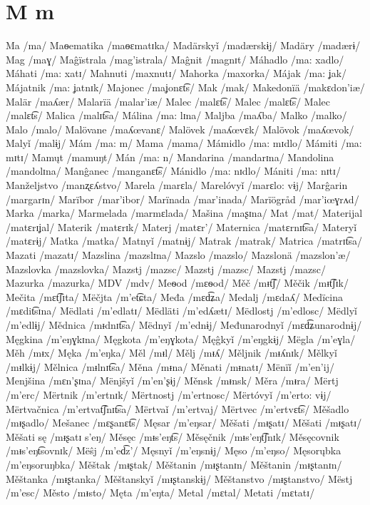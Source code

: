 \chapter{M m}

Ma /ma/
Maѳematika /maѳɛmatɪka/
Madärskyǐ /madærskɨj/
Madäry /madærɨ/
Mag /maɣ/
Maĝïstrala /mag’istrala/
Maĝnit /magnɪt/
Máhadlo /ma: xadlo/
Máhati /ma: xatɪ/
Mahnuti /maxnutɪ/
Mahorka /maxorka/
Májak /ma: ʝak/
Májatnik /ma: ʝatnɪk/
Majonec /maʝonɛt͡s/
Mak /mak/
Makedonïä /makɛdon’iæ/
Malär /maʎær/
Malarïä /malar’iæ/
Malec /malɛt͡s/
Malec /malɛt͡s/
Malec /malɛt͡s/
Malica /malɪt͡sa/
Málina /ma: lɪna/
Maljba /maʎba/
Malko /malko/
Malo /malo/
Malövane /maʎœvanɛ/
Malövek /maʎœvɛk/
Malövok /maʎœvok/
Malyǐ /malɨj/
Mám /ma: m/
Mama /mama/
Mámidlo /ma: mɪdlo/
Mámiti /ma: mɪtɪ/
Mamųt /mamuŋt/
Mán /ma: n/
Mandarina /mandarɪna/
Mandolina /mandolɪna/
Manĝanec /manganɛt͡s/
Mánidlo /ma: nɪdlo/
Mániti /ma: nɪtɪ/
Manželjstvo /manʐɛʎstvo/
Marela /marɛla/
Marelóvyǐ /marɛlo: vɨj/
Marĝarin /margarɪn/
Marïbor /mar’ibor/
Marïnada /mar’inada/
Marïögråd /mar’iœɣrʌd/
Marka /marka/
Marmelada /marmɛlada/
Mašina /maʂɪna/
Mat /mat/
Materijal /matɛrɪʝal/
Materik /matɛrɪk/
Materj /matɛr’/
Maternica /matɛrnɪt͡sa/
Materyǐ /matɛrɨj/
Matka /matka/
Matnyǐ /matnɨj/
Matrak /matrak/
Matrica /matrɪt͡sa/
Mazati /mazatɪ/
Mazslina /mazslɪna/
Mazslo /mazslo/
Mazslonä /mazslon’æ/
Mazslovka /mazslovka/
Mazstj /mazsc/
Mazstj /mazsc/
Mazstj /mazsc/
Mazurka /mazurka/
MDV /mdv/
Meѳod /mɛѳod/
Měč /mᵻt͡ʃ/
Měčik /mᵻt͡ʃɪk/
Mečita /mɛt͡ʃɪta/
Mëčjta /m’et͡ɕta/
Međa /mɛd͡ʑa/
Medalj /mɛdaʎ/
Medïcina /mɛdit͡sɪna/
Mëdlati /m’edlatɪ/
Mëdläti /m’edʎætɪ/
Mëdlostj /m’edlosc/
Mëdlyǐ /m’edlɨj/
Mědnica /mᵻdnɪt͡sa/
Mëdnyǐ /m’ednɨj/
Međunarodnyǐ /mɛd͡ʑunarodnɨj/
Męgkina /m’eŋɣkɪna/
Męgkota /m’eŋɣkota/
Męĝkyǐ /m’eŋgkɨj/
Mëgla /m’eɣla/
Měh /mᵻx/
Męka /m’eŋka/
Měl /mᵻl/
Mělj /mᵻʎ/
Měljnik /mᵻʎnɪk/
Mělkyǐ /mᵻlkɨj/
Mělnica /mᵻlnɪt͡sa/
Měna /mᵻna/
Měnati /mᵻnatɪ/
Mënïǐ /m’en’ij/
Menjšina /mɛn’ʂɪna/
Mënjšyǐ /m’en’ʂɨj/
Měnsk /mᵻnsk/
Měra /mᵻra/
Mërtj /m’erc/
Mërtnik /m’ertnɪk/
Mërtnostj /m’ertnosc/
Mërtóvyǐ /m’erto: vɨj/
Mërtvačnica /m’ertvat͡ʃnɪt͡sa/
Mërtvaǐ /m’ertvaj/
Mërtvec /m’ertvɛt͡s/
Měšadlo /mᵻʂadlo/
Mešanec /mɛʂanɛt͡s/
Męsar /m’eŋsar/
Měšati /mᵻʂatɪ/
Měšati /mᵻʂatɪ/
Měšati sę /mᵻʂatɪ s’eŋ/
Měsęc /mᵻs’eŋt͡s/
Měsęčnik /mᵻs’eŋt͡ʃnɪk/
Měsęcovnik /mᵻs’eŋt͡sovnɪk/
Mëŝj /m’ed͡z’/
Męsnyǐ /m’eŋsnɨj/
Męso /m’eŋso/
Męsorųbka /m’eŋsoruŋbka/
Měštak /mᵻʂtak/
Měštanin /mᵻʂtanɪn/
Měštanin /mᵻʂtanɪn/
Měštanka /mᵻʂtanka/
Měštanskyǐ /mᵻʂtanskɨj/
Měštanstvo /mᵻʂtanstvo/
Mëstj /m’esc/
Město /mᵻsto/
Męta /m’eŋta/
Metal /mɛtal/
Metati /mɛtatɪ/
